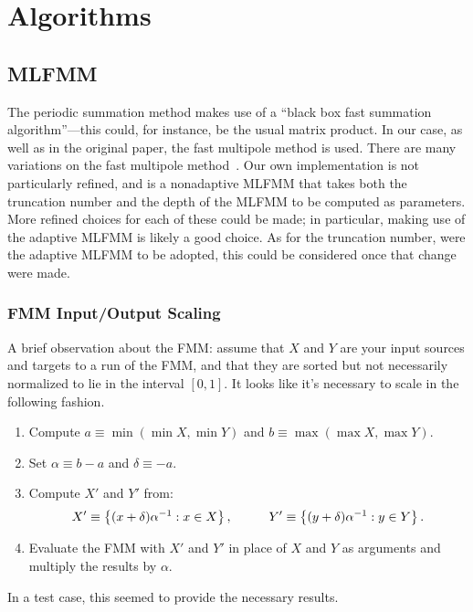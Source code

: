 \section{Algorithms}

\subsection{MLFMM}

The periodic summation method makes use of a ``black box fast
summation algorithm''\----this could, for instance, be the usual
matrix product. In our case, as well as in the original paper, the
fast multipole method is used. There are many variations on the fast
multipole method~\cite{book:fmm-helmholtz}. Our own implementation is
not particularly refined, and is a nonadaptive MLFMM that takes both
the truncation number and the depth of the MLFMM to be computed as
parameters. More refined choices for each of these could be made; in
particular, making use of the adaptive MLFMM is likely a good
choice. As for the truncation number, were the adaptive MLFMM to be
adopted, this could be considered once that change were made.

\subsubsection*{FMM Input/Output Scaling}

A brief observation about the FMM: assume that $X$ and $Y$ are your
input sources and targets to a run of the FMM, and that they are
sorted but not necessarily normalized to lie in the interval $[0, 1]$.
It looks like it's necessary to scale in the following
fashion.
\begin{enumerate}
\item Compute $a \equiv \min(\min X, \min Y) $
  and $b \equiv \max(\max X, \max Y)$.
\item Set $\alpha \equiv b - a$ and $\delta \equiv -a$.
\item Compute $X'$ and $Y'$ from:
  \begin{align*}
    X' \equiv \left\{(x + \delta)\alpha^{-1} : x \in X\right\}, \hspace{1cm} Y' \equiv \left\{(y + \delta) \alpha^{-1} : y \in Y\right\}.
  \end{align*}
\item Evaluate the FMM with $X'$
  and $Y'$
    in place of $X$
    and $Y$ as arguments and multiply the results by $\alpha$.
\end{enumerate}
In a test case, this seemed to provide the necessary results.

